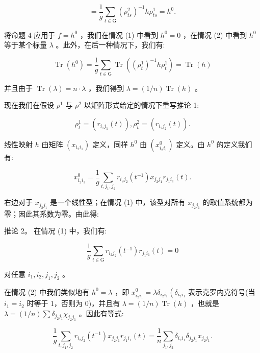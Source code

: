 \documentclass[10pt]{article}
\begin{document}
\[
= \frac{1}{g}\mathop{\sum }\limits_{{t \in  \mathrm{G}}}{\left( {\rho }_{ts}^{2}\right) }^{-1}h{\rho }_{ts}^{1} = {h}^{0}.
\]

将命题 4 应用于 \(f = {h}^{0}\) ，我们在情况 (1) 中看到 \({h}^{0} = 0\) ，在情况 (2) 中看到 \({h}^{0}\) 等于某个标量 \(\lambda\) 。此外，在后一种情况下，我们有:

\[
\operatorname{Tr}\left( {h}^{0}\right)  = \frac{1}{g}\mathop{\sum }\limits_{{t \in  \mathrm{G}}}\operatorname{Tr}\left( {{\left( {\rho }_{t}^{1}\right) }^{-1}h{\rho }_{t}^{1}}\right)  = \operatorname{Tr}\left( h\right)
\]

并且由于 \(\operatorname{Tr}\left( \lambda \right)  = n \cdot  \lambda\) ，我们得到 \(\lambda  = \left( {1/n}\right) \operatorname{Tr}\left( h\right)\) 。

现在我们在假设 \({\rho }^{1}\) 与 \({\rho }^{2}\) 以矩阵形式给定的情况下重写推论 1:

\[
{\rho }_{t}^{1} = \left( {{r}_{{i}_{1}{j}_{1}}\left( t\right) }\right) ,{\rho }_{t}^{2} = \left( {{r}_{{i}_{2}{j}_{2}}\left( t\right) }\right) .
\]

线性映射 \(h\) 由矩阵 \(\left( {x}_{{i}_{2}{i}_{1}}\right)\) 定义，同样 \({h}^{0}\) 由 \(\left( {x}_{{i}_{2}{i}_{1}}^{0}\right)\) 定义。由 \({h}^{0}\) 的定义我们有:

\[
{x}_{{i}_{2}{i}_{1}}^{0} = \frac{1}{g}\mathop{\sum }\limits_{{t,{j}_{1},{j}_{2}}}{r}_{{i}_{2}{j}_{2}}\left( {t}^{-1}\right) {x}_{{j}_{2}{j}_{1}}{r}_{{j}_{1}{i}_{1}}\left( t\right) .
\]

右边对于 \({x}_{{j}_{2}{j}_{1}}\) 是一个线性型；在情况 (1) 中，该型对所有 \({x}_{{j}_{2}{j}_{1}}\) 的取值系统都为零；因此其系数为零。由此得:

推论 2。 在情况 (1) 中，我们有:

\[
\frac{1}{g}\mathop{\sum }\limits_{{t \in  \mathrm{G}}}{r}_{{i}_{2}{j}_{2}}\left( {t}^{-1}\right) {r}_{{j}_{1}{i}_{1}}\left( t\right)  = 0
\]

对任意 \({i}_{1},{i}_{2},{j}_{1},{j}_{2}\) 。

在情况 (2) 中我们类似地有 \({h}^{0} = \lambda\) ，即 \({x}_{{i}_{2}{i}_{1}}^{0} = \lambda {\delta }_{{i}_{2}{i}_{1}}\left( {\delta }_{{i}_{2}{i}_{1}}\right.\) 表示克罗内克符号(当 \({i}_{1} = {i}_{2}\) 时等于 1，否则为 0)，并且有 \(\lambda  = \left( {1/n}\right) \operatorname{Tr}\left( h\right)\) ，也就是 \(\lambda  = \left( {1/n}\right) \sum {\delta }_{{j}_{2}{j}_{1}}{\chi }_{{j}_{2}{j}_{1}}\) 。因此有等式:

\[
\frac{1}{g}\mathop{\sum }\limits_{{t,{j}_{1},{j}_{2}}}{r}_{{i}_{2}{j}_{2}}\left( {t}^{-1}\right) {x}_{{j}_{2}{j}_{1}}{r}_{{j}_{1}{i}_{1}}\left( t\right)  = \frac{1}{n}\mathop{\sum }\limits_{{{j}_{1},{j}_{2}}}{\delta }_{{i}_{2}{i}_{1}}{\delta }_{{j}_{2}{j}_{1}}{x}_{{j}_{2}{j}_{1}}.
\]
\end{document}
